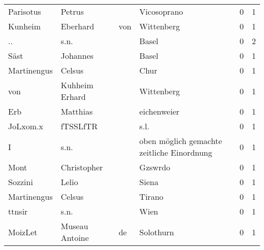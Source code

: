\begin{tabular}{llllrr}
                Parisotus &                             Petrus &             &                                 Vicosoprano &          0 &         1 \\
                  Kunheim &                           Eberhard &         von &                                  Wittenberg &          0 &         1 \\
                       .. &                               s.n. &             &                                       Basel &          0 &         2 \\
                     Säst &                           Johannes &             &                                       Basel &          0 &         1 \\
              Martinengus &                             Celsus &             &                                        Chur &          0 &         1 \\
                      von &                     Kuhheim Erhard &             &                                  Wittenberg &          0 &         1 \\
                      Erb &                           Matthias &             &                                 eichenweier &          0 &         1 \\
                 JoLxom.x &                           fTSSLfTR &             &                                        s.l. &          0 &         1 \\
                        I &                               s.n. &             &  oben möglich gemachte zeitliche Einordnung &          0 &         1 \\
                     Mont &                        Christopher &             &                                     Gzswrdo &          0 &         1 \\
                  Sozzini &                              Lelio &             &                                       Siena &          0 &         1 \\
              Martinengus &                             Celsus &             &                                      Tirano &          0 &         1 \\
                   ttnsir &                               s.n. &             &                                        Wien &          0 &         1 \\
                  MoizLet &                     Museau Antoine &          de &                                   Solothurn &          0 &         1 \\

\end{tabular}

